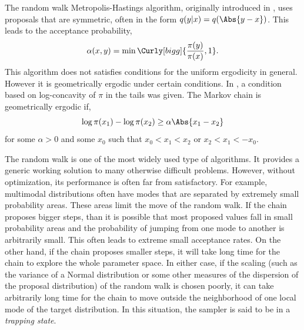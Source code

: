 The random walk Metropolis-Hastings algorithm, originally introduced in
\cite{Metropolis:1953ex}, uses proposals that are symmetric, often in the form
$q(y|x) = q(\Abs{y - x})$. This leads to the acceptance probability,
\begin{equation}
  \alpha(x,y) = \min\Curly[bigg]{\frac{\pi(y)}{\pi(x)},1}.
\end{equation}
This algorithm does not satisfies conditions for the uniform ergodicity in
general. However it is geometrically ergodic under certain conditions. In
\cite{Mengersen:1996th}, a condition based on log-concavity of $\pi$ in the
tails was given. The Markov chain is geometrically ergodic if,
\begin{equation}
  \log\pi(x_1) - \log\pi(x_2) \ge \alpha\Abs{x_1 - x_2}
\end{equation}
for some $\alpha > 0$ and some $x_0$ such that $x_0 < x_1 < x_2$ or $x_2 < x_1
< -x_0$.

The random walk is one of the most widely used type of \mcmc algorithms. It
provides a generic working solution to many otherwise difficult problems.
However, without optimization, its performance is often far from satisfactory.
For example, multimodal distributions often have modes that are separated by
extremely small probability areas. These areas limit the move of the random
walk. If the chain proposes bigger steps, than it is possible that most
proposed values fall in small probability areas and the probability of jumping
from one mode to another is arbitrarily small. This often leads to extreme
small acceptance rates. On the other hand, if the chain proposes smaller
steps, it will take long time for the chain to explore the whole parameter
space. In either case, if the scaling (such as the variance of a Normal
distribution or some other measures of the dispersion of the proposal
distribution) of the random walk is chosen poorly, it can take arbitrarily
long time for the chain to move outside the neighborhood of one local mode of
the target distribution. In this situation, the sampler is said to be in a
\emph{trapping state}.

